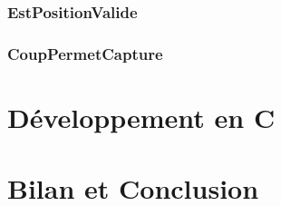     \subsubsection{EstPositionValide}
      
    \subsubsection{CoupPermetCapture}
      

  \newpage
  \section{Développement en C}
    
    

  \newpage
  \section{Bilan et Conclusion}
    


